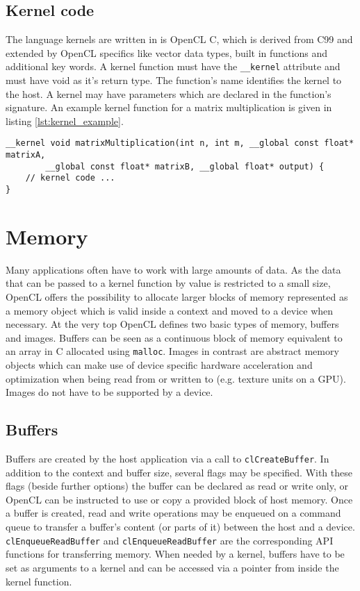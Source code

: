 \subsection{Kernel code}
The language kernels are written in is OpenCL C, which is derived from C99 and extended by OpenCL specifics like vector data types, built in functions and additional key words. A kernel function must have the \lstinline!__kernel! attribute and must have void as it's return type. The function's name identifies the kernel to the host. A kernel may have parameters which are declared in the function's signature. An example kernel function for a matrix multiplication is given in listing \ref{lst:kernel_example}.

\begin{lstlisting}[caption={An example of a kernel function's signature.},label={lst:kernel_example},language=CL]
__kernel void matrixMultiplication(int n, int m, __global const float* matrixA,
		__global const float* matrixB, __global float* output) {
	// kernel code ...
}
\end{lstlisting}

\section{Memory}
Many applications often have to work with large amounts of data. As the data that can be passed to a kernel function by value is restricted to a small size, OpenCL offers the possibility to allocate larger blocks of memory represented as a memory object which is valid inside a context and moved to a device when necessary. At the very top OpenCL defines two basic types of memory, buffers and images. Buffers can be seen as a continuous block of memory equivalent to an array in C allocated using \lstinline!malloc!. Images in contrast are abstract memory objects which can make use of device specific hardware acceleration and optimization when being read from or written to (e.g. texture units on a GPU). Images do not have to be supported by a device. \cite[p.23f]{opencl_book}

\subsection{Buffers}
Buffers are created by the host application via a call to \lstinline!clCreateBuffer!. In addition to the context and buffer size, several flags may be specified. With these flags (beside further options) the buffer can be declared as read or write only, or OpenCL can be instructed to use or copy a provided block of host memory. Once a buffer is created, read and write operations may be enqueued on a command queue to transfer a buffer's content (or parts of it) between the host and a device. \lstinline!clEnqueueReadBuffer! and \lstinline!clEnqueueReadBuffer! are the corresponding API functions for transferring memory. When needed by a kernel, buffers have to be set as arguments to a kernel and can be accessed via a pointer from inside the kernel function. \cite[p.24]{opencl_book}

